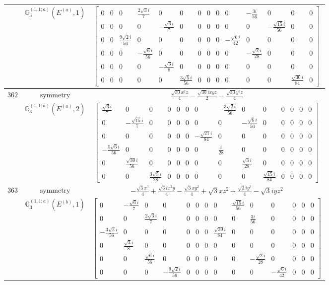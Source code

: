 \documentclass[fleqn,8pt,landscape]{jsarticle}
\begin{document}
\begin{longtable}{ccc}
$  $ & $ \mathbb{G}_{3}^{(1,1;a)}(E^{(a)},1) $ & $ \begin{bmatrix} 0 & 0 & 0 & \frac{2 \sqrt{3} i}{7} & 0 & 0 & 0 & 0 & 0 & 0 & - \frac{3 i}{56} & 0 & 0 & 0 \\ 0 & 0 & 0 & 0 & - \frac{\sqrt{6} i}{7} & 0 & 0 & 0 & 0 & 0 & 0 & - \frac{\sqrt{15} i}{56} & 0 & 0 \\ 0 & 0 & \frac{9 \sqrt{2} i}{56} & 0 & 0 & 0 & 0 & 0 & 0 & - \frac{\sqrt{6} i}{42} & 0 & 0 & 0 & 0 \\ 0 & 0 & 0 & - \frac{\sqrt{6} i}{56} & 0 & 0 & 0 & 0 & 0 & 0 & - \frac{\sqrt{2} i}{28} & 0 & 0 & 0 \\ 0 & 0 & 0 & 0 & - \frac{\sqrt{3} i}{8} & 0 & 0 & 0 & 0 & 0 & 0 & 0 & 0 & 0 \\ 0 & 0 & 0 & 0 & 0 & \frac{3 \sqrt{5} i}{56} & 0 & 0 & 0 & 0 & 0 & 0 & \frac{\sqrt{30} i}{84} & 0 \end{bmatrix} $ \\ \hline
$ 362 $ & $ \text{symmetry} $ & $ \frac{\sqrt{30} x^{2} z}{4} - \frac{\sqrt{30} i x y z}{2} - \frac{\sqrt{30} y^{2} z}{4} $ \\
$  $ & $ \mathbb{G}_{3}^{(1,1;a)}(E^{(a)},2) $ & $ \begin{bmatrix} \frac{\sqrt{3} i}{7} & 0 & 0 & 0 & 0 & 0 & 0 & - \frac{3 \sqrt{2} i}{56} & 0 & 0 & 0 & 0 & 0 & 0 \\ 0 & - \frac{\sqrt{15} i}{7} & 0 & 0 & 0 & 0 & 0 & 0 & - \frac{\sqrt{6} i}{56} & 0 & 0 & 0 & 0 & 0 \\ 0 & 0 & 0 & 0 & 0 & 0 & - \frac{\sqrt{21} i}{84} & 0 & 0 & 0 & 0 & 0 & 0 & 0 \\ - \frac{5 \sqrt{6} i}{56} & 0 & 0 & 0 & 0 & 0 & 0 & \frac{i}{28} & 0 & 0 & 0 & 0 & 0 & 0 \\ 0 & \frac{\sqrt{30} i}{56} & 0 & 0 & 0 & 0 & 0 & 0 & \frac{\sqrt{3} i}{28} & 0 & 0 & 0 & 0 & 0 \\ 0 & 0 & \frac{3 \sqrt{5} i}{28} & 0 & 0 & 0 & 0 & 0 & 0 & \frac{\sqrt{15} i}{84} & 0 & 0 & 0 & 0 \end{bmatrix} $ \\ \hline
$ 363 $ & $ \text{symmetry} $ & $ - \frac{\sqrt{3} x^{3}}{4} + \frac{\sqrt{3} i x^{2} y}{4} - \frac{\sqrt{3} x y^{2}}{4} + \sqrt{3} x z^{2} + \frac{\sqrt{3} i y^{3}}{4} - \sqrt{3} i y z^{2} $ \\
$  $ & $ \mathbb{G}_{3}^{(1,1;a)}(E^{(b)},1) $ & $ \begin{bmatrix} 0 & - \frac{\sqrt{6} i}{7} & 0 & 0 & 0 & 0 & 0 & 0 & \frac{\sqrt{15} i}{56} & 0 & 0 & 0 & 0 & 0 \\ 0 & 0 & \frac{2 \sqrt{3} i}{7} & 0 & 0 & 0 & 0 & 0 & 0 & \frac{3 i}{56} & 0 & 0 & 0 & 0 \\ - \frac{3 \sqrt{5} i}{56} & 0 & 0 & 0 & 0 & 0 & 0 & \frac{\sqrt{30} i}{84} & 0 & 0 & 0 & 0 & 0 & 0 \\ 0 & \frac{\sqrt{3} i}{8} & 0 & 0 & 0 & 0 & 0 & 0 & 0 & 0 & 0 & 0 & 0 & 0 \\ 0 & 0 & \frac{\sqrt{6} i}{56} & 0 & 0 & 0 & 0 & 0 & 0 & - \frac{\sqrt{2} i}{28} & 0 & 0 & 0 & 0 \\ 0 & 0 & 0 & - \frac{9 \sqrt{2} i}{56} & 0 & 0 & 0 & 0 & 0 & 0 & - \frac{\sqrt{6} i}{42} & 0 & 0 & 0 \end{bmatrix} $ \\ \hline

\end{longtable}
\end{document}
